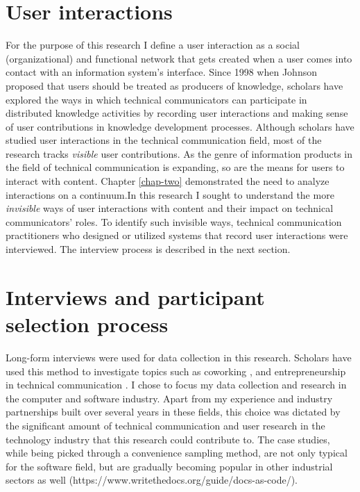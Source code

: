 \section{User interactions}
For the purpose of this research I define a user interaction as a social (organizational) and functional network that gets created when a user comes into contact with an information system's interface. Since 1998 when Johnson proposed that users should be treated as producers of knowledge, scholars have explored the ways in which technical communicators can participate in distributed knowledge activities by recording user interactions and making sense of user contributions in knowledge development processes.  Although scholars have studied user interactions in the technical communication field, most of the research tracks \textit{visible} user contributions.  As the genre of information products in the field of technical communication is expanding, so are the means for users to interact with content. Chapter \ref{chap-two} demonstrated the need to analyze interactions on a continuum.In this research I sought to understand the more \textit{invisible} ways of user interactions with content and their impact on technical communicators' roles. To identify such invisible ways, technical communication practitioners who designed or utilized systems that record user interactions were interviewed. The interview process is described in the next section.

\section{Interviews and participant selection process}

Long-form interviews were used for data collection in this research. Scholars have used this method to investigate topics such as coworking \cite{spinuzzi2012working}, and entrepreneurship in technical communication \cite{lauren2016networking}. I chose to focus my data collection and research in the computer and software industry. Apart from my experience and industry partnerships built over several years in these fields, this choice was dictated by the significant amount of technical communication and user research in the technology industry that this research could contribute to. The case studies, while being picked through a convenience sampling method, are not only typical for the software field, but are gradually becoming popular in other industrial sectors as well \cite{docsascode} (https://www.writethedocs.org/guide/docs-as-code/).

